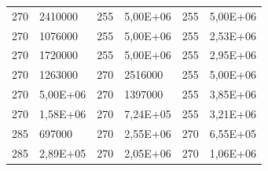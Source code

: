 \documentclass[3p,times,procedia,number]{elsarticle}
\begin{document}
\begin{table}[!h]
\begin{tabular}{ll|ll|ll}
		270                                                     & 2410000                       & 255                                                     & 5,00E+06                      & 255                                         & 5,00E+06                                 \\
		270                                                     & 1076000                       & 255                                                     & 5,00E+06                      & 255                                         & 2,53E+06                                 \\
		270                                                     & 1720000                       & 255                                                     & 5,00E+06                      & 255                                         & 2,95E+06                                 \\
		270                                                     & 1263000                       & 270                                                     & 2516000                       & 255                                         & 5,00E+06                                 \\
		270                                                     & 5,00E+06                      & 270                                                     & 1397000                       & 255                                         & 3,85E+06                                 \\
		270                                                     & 1,58E+06                      & 270                                                     & 7,24E+05                      & 255                                         & 3,21E+06                                 \\
		285                                                     & 697000                        & 270                                                     & 2,55E+06                      & 270                                         & 6,55E+05                                 \\
		285                                                     & 2,89E+05                      & 270                                                     & 2,05E+06                      & 270                                         & 1,06E+06                                 \\ \hline
	\end{tabular}
\end{table}
\end{document}
